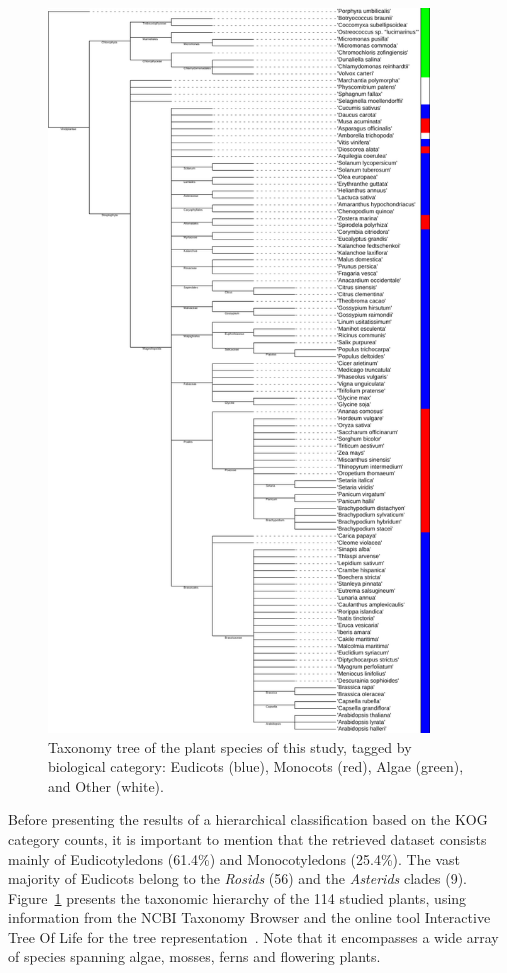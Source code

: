 \begin{figure}[htp]
\centering
\includegraphics[width=0.9\textwidth]{figures/Taxa}
\caption{Taxonomy tree of the plant species of this study, 
tagged by biological category: Eudicots (blue), Monocots 
(red), Algae (green), and Other (white).
}
\label{fig:taxa}
\end{figure}

Before presenting the results of a hierarchical 
classification based on the KOG category counts, it is 
important to mention that the retrieved dataset consists 
mainly of Eudicotyledons (61.4\%) and Monocotyledons (25.4\%). 
The vast majority of Eudicots belong to the \emph{Rosids} (56) 
and the \emph{Asterids} clades (9). Figure~\ref{fig:taxa} 
presents the taxonomic hierarchy of 
the 114 studied plants, using information from the NCBI Taxonomy 
Browser and the online tool Interactive Tree Of Life for 
the tree representation~\citep{letunic2021}. Note that it 
encompasses a wide array of species spanning algae, 
mosses, ferns and flowering plants.

